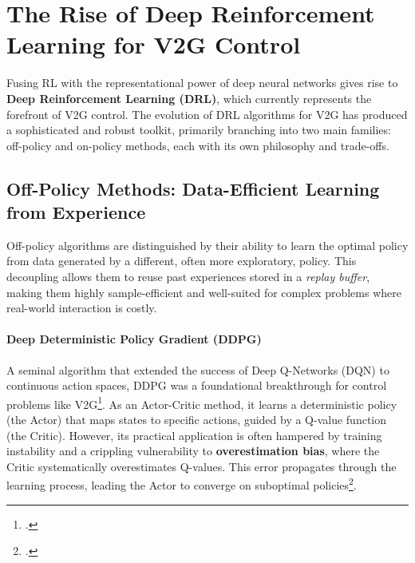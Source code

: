 


\section{The Rise of Deep Reinforcement Learning for V2G Control}
Fusing RL with the representational power of deep neural networks gives rise to \textbf{Deep Reinforcement Learning (DRL)}, which currently represents the forefront of V2G control. The evolution of DRL algorithms for V2G has produced a sophisticated and robust toolkit, primarily branching into two main families: off-policy and on-policy methods, each with its own philosophy and trade-offs.

\subsection{Off-Policy Methods: Data-Efficient Learning from Experience}
Off-policy algorithms are distinguished by their ability to learn the optimal policy from data generated by a different, often more exploratory, policy. This decoupling allows them to reuse past experiences stored in a \textit{replay buffer}, making them highly sample-efficient and well-suited for complex problems where real-world interaction is costly.

\paragraph{Deep Deterministic Policy Gradient (DDPG)}
A seminal algorithm that extended the success of Deep Q-Networks (DQN) to continuous action spaces, DDPG was a foundational breakthrough for control problems like V2G\footcite{lillicrap2015continuous}. As an Actor-Critic method, it learns a deterministic policy (the Actor) that maps states to specific actions, guided by a Q-value function (the Critic). However, its practical application is often hampered by training instability and a crippling vulnerability to \textbf{overestimation bias}, where the Critic systematically overestimates Q-values. This error propagates through the learning process, leading the Actor to converge on suboptimal policies\footcite{orfanoudakis2022deep, alfaverh2022optima}.

